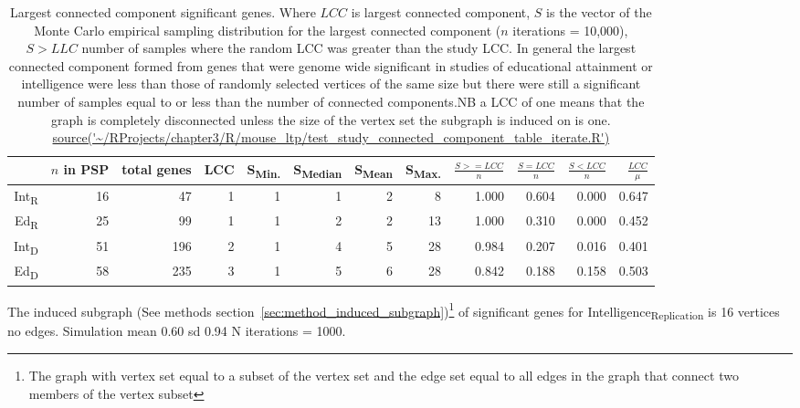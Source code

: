 \begin{table}[ht]
\centering
\begin{adjustbox}{width=\textwidth}

\begin{tabular}{rrrrrrrrrrrr}
  \toprule
 & $n$ in PSP & total genes & LCC & S\textsubscript{Min.} & S\textsubscript{Median} & S\textsubscript{Mean} & S\textsubscript{Max.} & $\frac{S>=LCC}{n}$ & $\frac{S=LCC}{n}$ & $\frac{S<LCC}{n}$ & $\frac{LCC}{\mu}$ \\ 
  \midrule
Int\textsubscript{R}  & 16 & 47 & 1 & 1 & 1 & 2 & 8 & 1.000 & 0.604 & 0.000 & 0.647 \\ 
  Ed\textsubscript{R}  & 25 & 99 & 1 & 1 & 2 & 2 & 13 & 1.000 & 0.310 & 0.000 & 0.452 \\ 
   Int\textsubscript{D} & 51 & 196 & 2 & 1 & 4 & 5 & 28 & 0.984 & 0.207 & 0.016 & 0.401 \\ 
  Ed\textsubscript{D}  & 58 & 235 & 3 & 1 & 5 & 6 & 28 & 0.842 & 0.188 & 0.158 & 0.503 \\ 
   \bottomrule
\end{tabular}
\end{adjustbox}
\caption[Largest connected component of significant genes]{Largest connected component significant genes. Where $LCC$ is largest connected component, $S$ is the vector of the Monte Carlo empirical sampling distribution for the largest connected component ($n$ iterations = 10,000), $S>LLC$ number of samples where the random LCC was greater than the study LCC. In general the largest connected component formed from genes that were genome wide significant in studies of educational attainment or intelligence were less than those of randomly selected vertices of the same size but there were still a significant number of samples equal to or less than the number of connected components.NB a LCC of one means that the graph is completely disconnected unless the size of the vertex set the subgraph is induced on is one. 
\tiny\url{source('~/RProjects/chapter3/R/mouse_ltp/test_study_connected_component_table_iterate.R')}}
\label{tab:Largest connected component significant genes}
\end{table}

The induced subgraph (See methods section~\ref{sec:method_induced_subgraph})\footnote{The graph with vertex set equal to a subset of the vertex set and the edge set equal to all edges in the graph that connect two members of the vertex subset} of significant genes for Intelligence\textsubscript{Replication} is 16 vertices no edges. Simulation mean 0.60 sd 0.94 N iterations = 1000.

